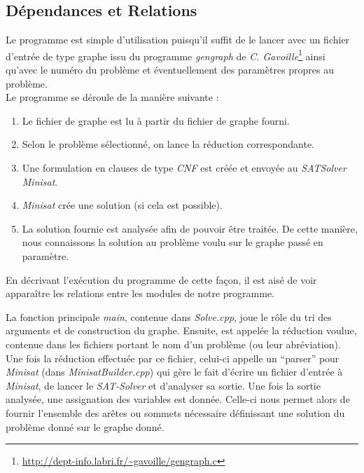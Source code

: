   \subsection{Dépendances et Relations}
  Le programme est simple d'utilisation puisqu'il suffit de le lancer
  avec un fichier d'entrée de type graphe issu du programme
  \emph{gengraph} de
  \emph{C. Gavoille}\footnote{\url{http://dept-info.labri.fr/~gavoille/gengraph.c}}
  ainsi qu'avec le numéro du problème et éventuellement des paramètres
  propres au problème.\\
  Le programme se déroule de la manière suivante :
  \begin{enumerate}
   \item Le fichier de graphe est lu à partir du fichier de graphe
	 fourni. 
   \item Selon le problème sélectionné, on lance la réduction
	 correspondante. 
   \item Une formulation en clauses de type \emph{CNF} est créée et
	 envoyée au \emph{SATSolver} \emph{Minisat}. 
   \item \emph{Minisat} crée une solution (si cela est possible).
   \item La solution fournie est analysée afin de pouvoir être
	 traitée. De cette manière, nous connaissons la solution au
	 problème voulu sur le graphe passé en paramètre. 
  \end{enumerate}
  
  En décrivant l'exécution du programme de cette façon, il est aisé de
  voir apparaître les relations entre les modules de notre programme.

  La fonction principale \emph{main}, contenue dans \emph{Solve.cpp},
  joue le rôle du tri des arguments et de construction du
  graphe. Ensuite, est appelée la réduction voulue, contenue dans les
  fichiers portant le nom d'un problème (ou leur abréviation). Une fois
  la réduction effectuée par ce fichier, celui-ci appelle un ``parser''
  pour \emph{Minisat} (dans \emph{MinisatBuilder.cpp}) qui gère le fait
  d'écrire un fichier d'entrée à \emph{Minisat}, de lancer le
  \emph{SAT-Solver} et d'analyser sa sortie. Une fois la sortie
  analysée, une assignation des variables est donnée. Celle-ci nous
  permet alors de fournir l'ensemble des arêtes ou sommets nécessaire
  définissant une solution du problème donné sur le graphe donné.\\

